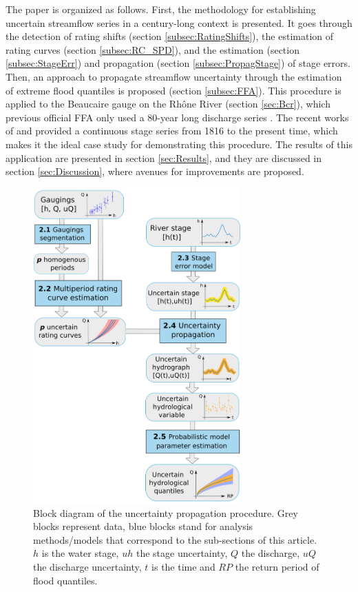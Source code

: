 \documentclass[11pt]{article}
\begin{document}
    The paper is organized as follows. First, the methodology for establishing uncertain streamflow series in a century-long context is presented. It goes through the detection of rating shifts (section \ref{subsec:RatingShifts}), the estimation of rating curves (section \ref{subsec:RC_SPD}), and the estimation (section \ref{subsec:StageErr}) and propagation (section \ref{subsec:PropagStage}) of stage errors. Then, an approach to propagate streamflow uncertainty through the estimation of extreme flood quantiles is proposed (section \ref{subsec:FFA}). This procedure is applied to the Beaucaire gauge on the Rhône River (section \ref{sec:Bcr}), which previous official FFA only used a 80-year long discharge series \citep{rigaudiere_etude_2000}. The recent works of \citet{pichard_hydro-climatology_2017} and \citet{bard_actualisation_2018} provided a continuous stage series from 1816 to the present time, which makes it the ideal case study for demonstrating this procedure. The results of this application are presented in section \ref{sec:Results}, and they are discussed in section \ref{sec:Discussion}, where avenues for improvements are proposed.
    
    \begin{figure}[h!]
    \centering
        \includegraphics[width = 8cm]{Figs/1-uTotSchema.png}
        \caption{Block diagram of the uncertainty propagation procedure. Grey blocks represent data, blue blocks stand for analysis methods/models that correspond to the sub-sections of this article. $h$ is the water stage, $uh$ the stage uncertainty, $Q$ the discharge, $uQ$ the discharge uncertainty, $t$ is the time and $RP$ the return period of flood quantiles.}
        \label{fig:ChProp}
    \end{figure}
    \FloatBarrier
    
\end{document}
